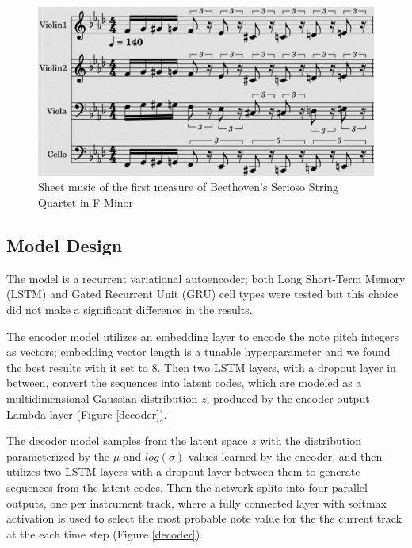 \documentclass[sigconf,authorversion]{acmart}
\begin{document}
\begin{figure}[h]
  \centering
  \includegraphics[width=\linewidth]{figures/first_bar_sheet.png}
  \caption{Sheet music of the first measure of Beethoven's Serioso
    String Quartet in F Minor}
  \label{sheet}
\end{figure}

\subsection{Model Design}

The model is a recurrent variational autoencoder; both Long Short-Term
Memory (LSTM) and Gated Recurrent Unit (GRU) cell types were tested
but this choice did not make a significant difference in the results.

The encoder model utilizes an embedding layer to encode the note pitch
integers as vectors; embedding vector length is a tunable
hyperparameter and we found the best results with it set to 8. Then
two LSTM layers, with a dropout layer in between, convert the
sequences into latent codes, which are modeled as a multidimensional
Gaussian distribution $z$, produced by the encoder output Lambda layer
(Figure \ref{decoder}).

The decoder model samples from the latent space $z$ with the
distribution parameterized by the $\mu$ and $log(\sigma)$ values
learned by the encoder, and then utilizes two LSTM layers with a
dropout layer between them to generate sequences from the latent
codes. Then the network splits into four parallel outputs, one per
instrument track, where a fully connected layer with softmax
activation is used to select the most probable note value for the
the current track at the each time step (Figure \ref{decoder}).
\end{document}
